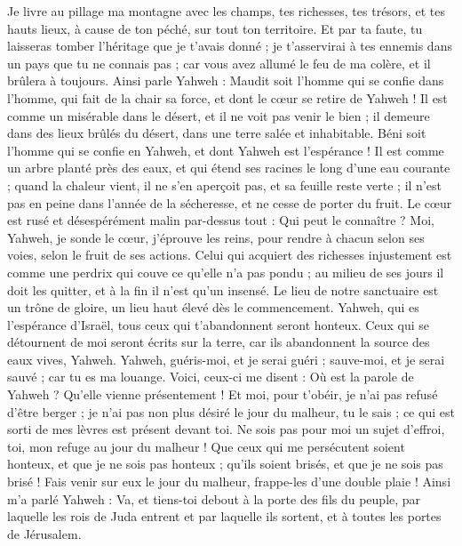 \begin{multicols}{2}
Je livre au pillage ma montagne avec les champs, tes richesses, tes trésors, et tes hauts lieux, à cause de ton péché, sur tout ton territoire.
Et par ta faute, tu laisseras tomber l'héritage que je t'avais donné ; je t'asservirai à tes ennemis dans un pays que tu ne connais pas ; car vous avez allumé le feu de ma colère, et il brûlera à toujours.
Ainsi parle Yahweh : Maudit soit l'homme qui se confie dans l'homme, qui fait de la chair sa force, et dont le cœur se retire de Yahweh !
Il est comme un misérable dans le désert, et il ne voit pas venir le bien ; il demeure dans des lieux brûlés du désert, dans une terre salée et inhabitable.
Béni soit l'homme qui se confie en Yahweh, et dont Yahweh est l'espérance !
Il est comme un arbre planté près des eaux, et qui étend ses racines le long d'une eau courante ; quand la chaleur vient, il ne s'en aperçoit pas, et sa feuille reste verte ; il n'est pas en peine dans l'année de la sécheresse, et ne cesse de porter du fruit.
Le cœur est rusé et désespérément malin par-dessus tout : Qui peut le connaître ?
Moi, Yahweh, je sonde le cœur, j'éprouve les reins, pour rendre à chacun selon ses voies, selon le fruit de ses actions.
Celui qui acquiert des richesses injustement est comme une perdrix qui couve ce qu'elle n'a pas pondu ; au milieu de ses jours il doit les quitter, et à la fin il n'est qu'un insensé.
Le lieu de notre sanctuaire est un trône de gloire, un lieu haut élevé dès le commencement.
Yahweh, qui es l'espérance d'Israël, tous ceux qui t'abandonnent seront honteux. Ceux qui se détournent de moi seront écrits sur la terre, car ils abandonnent la source des eaux vives, Yahweh.
Yahweh, guéris-moi, et je serai guéri ; sauve-moi, et je serai sauvé ; car tu es ma louange.
Voici, ceux-ci me disent : Où est la parole de Yahweh ? Qu'elle vienne présentement !
Et moi, pour t'obéir, je n'ai pas refusé d'être berger ; je n'ai pas non plus désiré le jour du malheur, tu le sais ; ce qui est sorti de mes lèvres est présent devant toi.
Ne sois pas pour moi un sujet d'effroi, toi, mon refuge au jour du malheur !
Que ceux qui me persécutent soient honteux, et que je ne sois pas honteux ; qu'ils soient brisés, et que je ne sois pas brisé ! Fais venir sur eux le jour du malheur, frappe-les d'une double plaie !
Ainsi m'a parlé Yahweh : Va, et tiens-toi debout à la porte des fils du peuple, par laquelle les rois de Juda entrent et par laquelle ils sortent, et à toutes les portes de Jérusalem.

\end{multicols}
